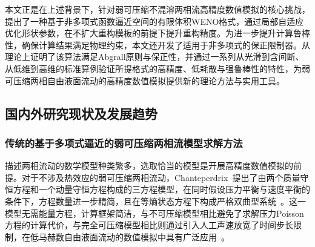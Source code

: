\documentclass[12pt,a4paper]{article}
\numberwithin{equation}{section}    %
\begin{document}
本文正是在上述背景下，针对弱可压缩不混溶两相流高精度数值模拟的核心挑战，提出了一种基于非多项式函数逼近空间的有限体积WENO格式，通过局部自适应优化形状参数，在不扩大重构模板的前提下提升重构精度。为进一步提升计算鲁棒性，确保计算结果满足物理约束，本文还开发了适用于非多项式的保正限制器。从理论上证明了该算法满足Abgrall原则与保正性，并通过一系列从光滑到含间断、从低维到高维的标准算例验证所提格式的高精度、低耗散与强鲁棒性的特性，为弱可压缩两相自由液面流动的高精度数值模拟提供新的理论方法与实用工具。
\subsection{国内外研究现状及发展趋势}

\subsubsection{传统的基于多项式逼近的弱可压缩两相流模型求解方法}

描述两相流动的数学模型种类繁多，选取恰当的模型是开展高精度数值模拟的前提。对于不涉及热效应的弱可压缩两相流动，Chanteperdrix~\cite{Chanteperdrix2004}提出了由两个质量守恒方程和一个动量守恒方程构成的三方程模型，在同时假设压力平衡与速度平衡的条件下，方程数量进一步精简，且在等熵状态方程下构成严格双曲型系统~\cite{grenier2013accurate}。这一模型无需能量方程，计算框架简洁，与不可压缩模型相比避免了求解压力Poisson方程的计算代价，与完全可压缩模型相比则通过引入人工声速放宽了时间步长限制，在低马赫数自由液面流动的数值模拟中具有广泛应用~\cite{li2020finite,zhang2023physical}。%

\end{document}
